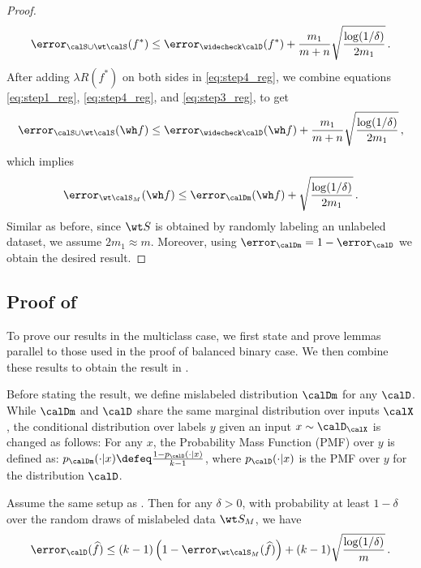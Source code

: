 \begin{proof}
\begin{align}
        \error_{\calS \cup \wt\calS}(f^*) \le \error_{ \widecheck \calD}(f^*) +  \frac{m_1}{m+n}\sqrt{\frac{\log(1/\delta)}{2 m_1}} \,. \label{eq:step4_reg} 
    \end{align}
    After adding $\lambda R(f^*)$ on both sides in \eqref{eq:step4_reg}, we combine equations \eqref{eq:step1_reg}, \eqref{eq:step4_reg}, and \eqref{eq:step3_reg}, to get 
    \begin{align}
        \error_{\calS \cup \wt \calS}(\wh f) \le \error_{\widecheck \calD}(\wh f) +  \frac{m_1}{m+n}\sqrt{\frac{\log(1/\delta)}{2 m_1}} \,, 
    \end{align}
    which implies 
    \begin{align}
        \error_{ \wt \calS_M}(\wh f) \le \error_{\calDm}(\wh f) + \sqrt{\frac{\log(1/\delta)}{2 m_1}} \,. \label{eq:lemma_reg_final}
    \end{align}
    Similar as before, since $\wt S$ is obtained by randomly labeling an unlabeled dataset, we assume 
    $2m_1 \approx m$. Moreover, using $\error_{\calDm} = 1 - \error_{\calD}$ we obtain the desired result. 
\end{proof}
    

\subsection{Proof of }

To prove our results in the multiclass case,
we first state and prove lemmas
parallel to those
used in the proof of balanced binary case. 
We then combine these results 
to obtain the result in . 

Before stating the result, 
we define mislabeled distribution $\calDm$ for any $\calD$.
While $\calDm$ and $\calD$ share 
the same marginal distribution over inputs $\calX$,
the conditional distribution over labels $y$ 
given an input $x\sim \calD_\calX$ is changed as follows:
For any $x$, the Probability Mass Function (PMF) over $y$ is defined as:  
$p_{\calDm} (\cdot \vert x) \defeq \frac{1 - p_{\calD}(\cdot \vert x)}{k - 1}$, where $ p_{\calD}(\cdot \vert x)$ is the PMF over $y$ for the distribution $\calD$. 

\begin{lemma} \label{lem:fit_mislabeled_multi}
    Assume the same setup as . 
    Then for any $\delta >0$, with probability at least  $1-\delta$ 
    over the random draws of mislabeled data $\wt S_M$, we have 
    \begin{align}
        \error_\calD(\widehat f)  \le (k-1)\left(1 -\error_{\wt \calS_M}(\widehat f)\right) + (k-1)\sqrt{\frac{\log(1/\delta)}{m}}\,. \label{eq:lemma1_multi}
    \end{align}   
\end{lemma} 


